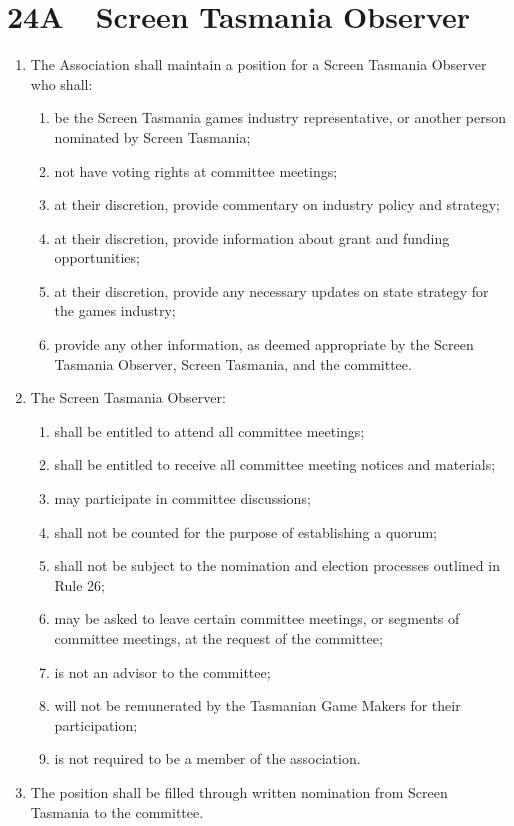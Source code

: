 \section*{24A~~Screen Tasmania Observer}
\begin{enumerate}
\item The Association shall maintain a position for a Screen Tasmania Observer who shall:
\begin{enumerate}
\item be the Screen Tasmania games industry representative, or another person nominated by Screen Tasmania;
\item not have voting rights at committee meetings;
\item at their discretion, provide commentary on industry policy and strategy;
\item at their discretion, provide information about grant and funding opportunities;
\item at their discretion, provide any necessary updates on state strategy for the games industry;
\item provide any other information, as deemed appropriate by the Screen Tasmania Observer, Screen Tasmania, and the committee.
\end{enumerate}

\item The Screen Tasmania Observer:
\begin{enumerate}
\item shall be entitled to attend all committee meetings;
\item shall be entitled to receive all committee meeting notices and materials;
\item may participate in committee discussions;
\item shall not be counted for the purpose of establishing a quorum;
\item shall not be subject to the nomination and election processes outlined in Rule 26;
\item may be asked to leave certain committee meetings, or segments of committee meetings, at the request of the committee;
\item is not an advisor to the committee;
\item will not be remunerated by the Tasmanian Game Makers for their participation;
\item is not required to be a member of the association.
\end{enumerate}

\item The position shall be filled through written nomination from Screen Tasmania to the committee.


\end{enumerate}
